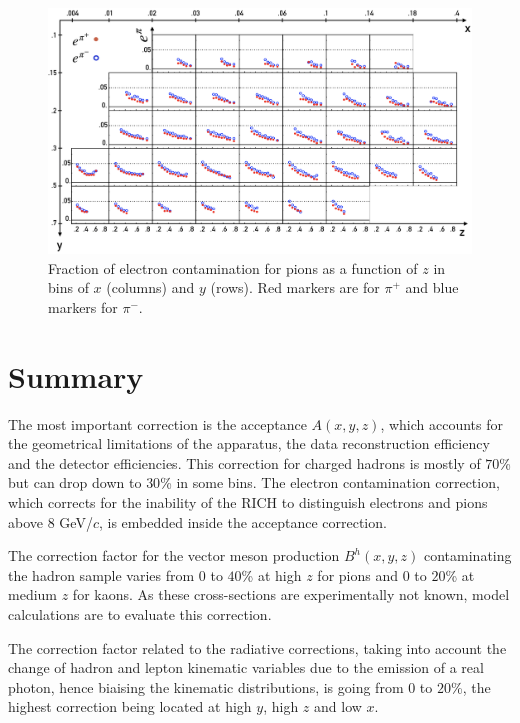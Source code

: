 \begin{figure}
	\includegraphics[scale=0.7]{./gfx/econt.png}
	\caption{Fraction of electron contamination for pions as a function of $z$ in bins of $x$ (columns) and $y$ (rows). Red markers are for $\pi^+$ and blue markers for $\pi^-$.}
	\label{pic:epi}
\end{figure}

\section{Summary}

The most important correction is the acceptance $A(x,y,z)$, which accounts for the geometrical limitations of the apparatus, the data reconstruction efficiency and the detector efficiencies. This correction for charged hadrons is mostly of $70$\% but can drop down to $30$\% in some bins. The electron contamination correction, which corrects for the inability of the RICH to distinguish electrons and pions above $8$ GeV/$c$, is embedded inside the acceptance correction.

The correction factor for the vector meson production $B^h(x,y,z)$ contaminating the hadron sample varies from $0$ to $40$\% at high $z$ for pions and $0$ to $20$\% at medium $z$ for kaons. As these cross-sections are experimentally not known, model calculations are to evaluate this correction.

The correction factor related to the radiative corrections, taking into account the change of hadron and lepton kinematic variables due to the emission of a real photon, hence biaising the kinematic distributions, is going from $0$ to $20$\%, the highest correction being located at high $y$, high $z$ and low $x$.
